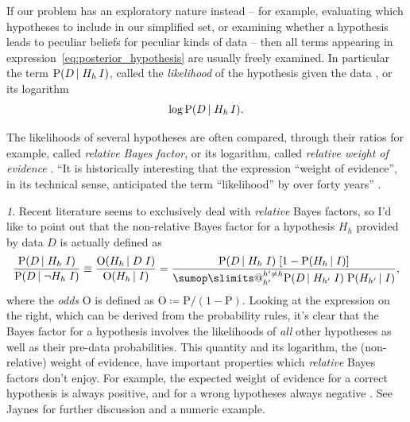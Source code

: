 \documentclass[\ifafour a4paper,12pt,\else a5paper,10pt,\fi%
onecolumn,oneside,article,%
british%
]{memoir}
\makeatletter
\theoremstyle{remark}
\theoremstyle{innote}
\newtheorem*{innote}{}
\def\sum{\DOTSI\sumop\slimits@}
\newcommand*{\citep}{\parencites}
\newcommand*{\citey}{\parencites*}
\newcommand*{\defd}{\coloneqq}
\newcommand*{\p}{\mathrm{P}}%
\renewcommand*{\|}[1][]{\nonscript\,#1\vert\nonscript\;\mathopen{}}
\newcommand*{\sect}{\S}%
\newcommand*{\sects}{\S\S}%
\newcommand*{\chap}{ch.}%
\newcommand*{\chaps}{chs}%
\newcommand*{\yK}{I}
\newcommand*{\yO}{\mathrm{O}}
\makeatother
\begin{document}
If our problem has an exploratory nature instead -- for example, evaluating
which hypotheses to include in our simplified set, or examining whether a
hypothesis leads to peculiar beliefs for peculiar kinds of data -- then all
terms appearing in expression~\eqref{eq:posterior_hypothesis} are usually
freely examined. In particular the term $\p(D \| H_{h} \, \yK)$, called the
\emph{likelihood} of the hypothesis given the data \citep[\sect~6.1
p.~62]{good1950}, or its logarithm
\begin{equation}
  \label{eq:log-likelihood}
  \log\p(D \| H_{h} \, \yK).
\end{equation}


The likelihoods of several hypotheses are often compared, through their
ratios for example, called \emph{relative Bayes factor}, or its logarithm,
called \emph{relative weight of evidence}
\citep[\chap~6]{good1950}{good1975,good1981,good1985}[and many other works
in][]{good1983}[\sect~1.4]{osteyeeetal1974}{mackay1992,kassetal1995}[see
also][\chaps~V, VI, A]{jeffreys1939_r1983}. \enquote{It is historically
  interesting that the expression ``weight of evidence'', in its technical
  sense, anticipated the term ``likelihood'' by over forty years}
\citep[\sect~1.4.2 p.~12]{osteyeeetal1974}.
\begin{innote}
  Recent literature \citep[for example][]{kassetal1995} seems to
  exclusively deal with \emph{relative} Bayes factors, so I'd like to point
  out that the non-relative Bayes factor for a hypothesis $H_{h}$ provided
  by data $D$ is actually defined as \citep[\sect~2]{good1981}
  \begin{equation}
    \label{eq:proper_Bayes_factor}
    \frac{\p(D \| H_{h} \; \yK)}{\p(D \| \lnot H_{h} \; \yK)} \equiv
    \frac{\yO(H_{h} \| D \; \yK)}{\yO(H_{h} \| \yK)} =
    \frac{\p(D \| H_{h}\; \yK)\; [1- \p(H_{h} \| \yK)]}{
\sum_{h'}^{h' \ne h} \p(D \| H_{h'} \; \yK) \; \p(H_{h'} \| \yK)
    },
  \end{equation}
  where the \emph{odds} $\yO$ is defined as $\yO \defd \p/(1-\p)$. Looking
  at the expression on the right, which can be derived from the probability
  rules, it's clear that the Bayes factor for a hypothesis involves the
  likelihoods of \emph{all} other hypotheses as well as their pre-data
  probabilities. This quantity and its logarithm, the (non-relative) weight
  of evidence, have important properties which \emph{relative} Bayes factors
  don't enjoy. For example, the expected weight of evidence for a correct
  hypothesis is always positive, and for a wrong hypotheses always negative
  \citep[\sect~6.7]{good1950}. See Jaynes
  \citey[\sects~4.3--4.4]{jaynes1994_r2003} for further discussion and a
  numeric example.
\end{innote}
\end{document}
